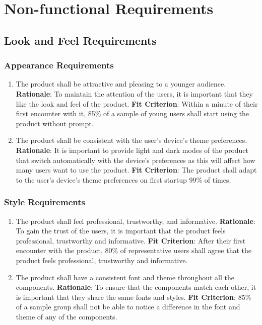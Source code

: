 \documentclass[12pt, titlepage]{article}
\begin{document}
\section{Non-functional Requirements}

\subsection{Look and Feel Requirements}
\subsubsection{Appearance Requirements}
\begin{enumerate}[label = NFR-\arabic*, left=\parindent, series=nfr]
    \item The product shall be attractive and pleasing to a younger audience.
    \newline \textbf{Rationale}: To maintain the attention of the users, it is important that they like the look and feel of the product. 
    \newline \textbf{Fit Criterion}: Within a minute of their first encounter with it, 85\% of a sample of young users shall start using the product without prompt.
    \item The product shall be consistent with the user's device's theme preferences.
    \newline \textbf{Rationale}: It is important to provide light and dark modes of the product that switch automatically with the device's preferences as this will affect how many users want to use the product.
    \newline \textbf{Fit Criterion}: The product shall adapt to the user's device's theme preferences on first startup 99\% of times.
\end{enumerate}

\subsubsection{Style Requirements}
\begin{enumerate}[nfr]
    \item The product shall feel professional, trustworthy, and informative.
    \newline \textbf{Rationale}: To gain the trust of the users, it is important that the product feels professional, trustworthy and informative.
    \newline \textbf{Fit Criterion}: After their first encounter with the product, 80\% of representative users shall agree that the product feels professional, trustworthy and informative.
    \item The product shall have a consistent font and theme throughout
    all the components.
    \newline \textbf{Rationale}: To ensure that the components match each other, it is important that they share the same fonts and styles.
    \newline \textbf{Fit Criterion}: 85\% of a sample group shall not be able to notice a difference in the font and theme of any of the components.
\end{enumerate}
\end{document}

